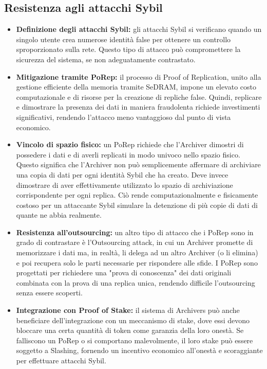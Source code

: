 \documentclass[a4paper,12pt]{report}
\begin{document}
	\subsection{Resistenza agli attacchi Sybil}
	\begin{itemize}
		\item \textbf{Definizione degli attacchi Sybil:} gli attacchi Sybil si verificano quando un singolo utente crea numerose identità false per ottenere un controllo sproporzionato sulla rete. Questo tipo di attacco può compromettere la sicurezza del sistema, se non adeguatamente contrastato.
		\item \textbf{Mitigazione tramite PoRep:} il processo di Proof of Replication, unito alla gestione efficiente della memoria tramite SeDRAM, impone un elevato costo computazionale e di risorse per la creazione di repliche false. Quindi, replicare e dimostrare la presenza dei dati in maniera fraudolenta richiede investimenti significativi, rendendo l'attacco meno vantaggioso dal punto di vista economico.
		\item \textbf{Vincolo di spazio fisico:} un PoRep richiede che l'Archiver dimostri di possedere i dati e di averli replicati in modo univoco nello spazio fisico. Questo significa che l'Archiver non può semplicemente affermare di archiviare una copia di dati per ogni identità Sybil che ha creato. Deve invece dimostrare di aver effettivamente utilizzato lo spazio di archiviazione corrispondente per ogni replica. Ciò rende computazionalmente e fisicamente costoso per un attaccante Sybil simulare la detenzione di più copie di dati di quante ne abbia realmente.
		\item \textbf{Resistenza all'outsourcing:} un altro tipo di attacco che i PoRep sono in grado di contrastare è l'Outsourcing attack, in cui un Archiver promette di memorizzare i dati ma, in realtà, li delega ad un altro Archiver (o li elimina) e poi recupera solo le parti necessarie per rispondere alle sfide. I PoRep sono progettati per richiedere una "prova di conoscenza" dei dati originali combinata con la prova di una replica unica, rendendo difficile l'outsourcing senza essere scoperti.
		\item \textbf{Integrazione con Proof of Stake:} il sistema di Archivers può anche beneficiare dell'integrazione con un meccanismo di stake, dove essi devono bloccare una certa quantità di token come garanzia della loro onestà. Se falliscono un PoRep o si comportano malevolmente, il loro stake può essere soggetto a Slashing, fornendo un incentivo economico all'onestà e scoraggiante per effettuare attacchi Sybil.
	\end{itemize}
	
\end{document}

